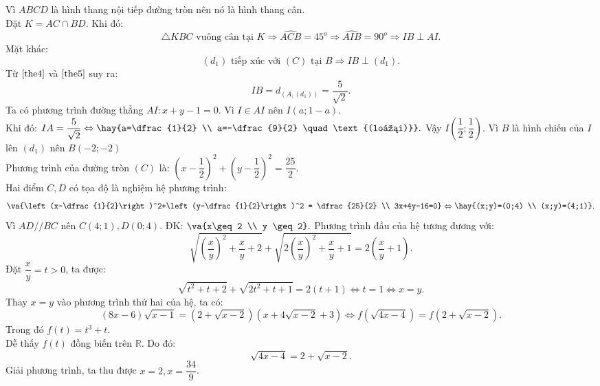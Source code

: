 Vì $ABCD$ là hình thang nội tiếp đường tròn nên nó là hình thang cân. \\
Đặt $K = AC \cap BD$. Khi đó:
\begin{equation} \label{the4}
\triangle KBC \text{ vuông cân tại } K \Rightarrow \widehat{ACB}=45^o \Rightarrow \widehat{AIB} = 90^o \Rightarrow IB \perp AI.
\end{equation}
Mặt khác:
\begin{equation} \label{the5}
 (d_1)\text{ tiếp xúc với } (C) \text{ tại } B \Rightarrow  IB \perp (d_1).
\end{equation}
Từ $\eqref{the4}$ và $\eqref{the5}$ suy ra:
$$IB= d_{\left( A,(d_1) \right)} = \dfrac{5}{\sqrt{2}}.$$
Ta có phương trình đường thẳng $AI: x+y-1=0$. Vì $I \in AI$ nên $I(a;1-a)$.\\ Khi đó:
$IA = \dfrac{5}{\sqrt{2}} \Leftrightarrow \hay{a=\dfrac{1}{2} \\ a=-\dfrac{9}{2} \quad \text{(loại)}} .$
Vậy $I\left(\dfrac{1}{2}; \dfrac{1}{2}\right)$.
Vì $B$ là hình chiếu của $I$ lên $(d_1)$ nên $B(-2;-2)$\\
Phương trình của đường tròn $(C)$ là:
$\left(x-\dfrac{1}{2}\right)^2+\left(y-\dfrac{1}{2}\right)^2 = \dfrac{25}{2}.$\\
Hai điểm $C,D$ có tọa độ là nghiệm hệ phương trình:
$$\va{\left(x-\dfrac{1}{2}\right)^2+\left(y-\dfrac{1}{2}\right)^2 = \dfrac{25}{2} \\ 3x+4y-16=0} \Leftrightarrow \hay{(x;y)=(0;4) \\ (x;y)=(4;1)}.$$
Vì $AD//BC$ nên $C(4;1),D(0;4).$
\hda
ĐK: $\va{x\geq 2 \\ y \geq 2}.$
Phương trình đầu của hệ tương đương với:
$$\sqrt{\left(\dfrac{x}{y}\right)^2+\dfrac{x}{y}+2}+\sqrt{2\left(\dfrac{x}{y}\right)^2+\dfrac{x}{y}+1}=2\left(\dfrac{x}{y}+1\right).$$
Đặt $\dfrac{x}{y}=t>0$, ta được:
$$\sqrt{t^2+t+2}+\sqrt{2t^2+t+1}=2(t+1) \Leftrightarrow t=1 \Leftrightarrow x= y.$$
Thay $x=y$ vào phương trình thứ hai của hệ, ta có:
$$(8x-6)\sqrt{x-1}=\left(2+\sqrt{x-2} \right) \left(x + 4\sqrt{x-2}+3 \right) \Leftrightarrow f\left(\sqrt{4x-4}\right) = f\left(2 + \sqrt{x-2}\right).$$
Trong đó $f(t) = t^3+t$.\\
Dễ thấy $f(t)$ đồng biến trên $\mathbb{R}$. Do đó:
$$\sqrt{4x-4} = 2 + \sqrt{x-2}.$$ 
Giải phương trình, ta thu được $x=2,x=\dfrac{34}{9}$.\\
